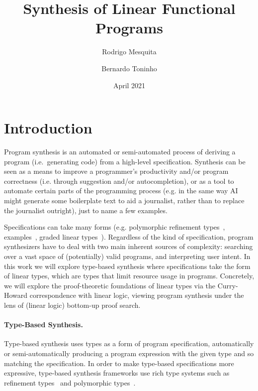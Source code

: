 \documentclass{llncs}
\title{Synthesis of Linear Functional Programs}
\author{Rodrigo Mesquita \and Bernardo Toninho}
\date{April 2021}
\institute{NOVA School of Science and Technology}
\newcommand{\mypara}[1]{\paragraph{\textbf{#1}.}}
\begin{document}
\maketitle

\section{Introduction}

Program synthesis is an automated or semi-automated process of
deriving a program (i.e.~generating code) from a high-level
specification.  
%
Synthesis can be seen as a means to improve a programmer's
productivity and/or program correctness (i.e. through suggestion
and/or autocompletion), or as a tool to automate certain parts of the
programming process (e.g. in the same way AI might generate some
boilerplate text to aid a journalist, rather than to replace the
journalist outright), just to name a few examples.

Specifications can take many forms (e.g.  polymorphic refinement
types~\cite{DBLP:conf/pldi/PolikarpovaKS16},
examples~\cite{DBLP:conf/popl/FrankleOWZ16}, graded linear
types~\cite{DBLP:conf/lopstr/HughesO20}).  Regardless of the kind
of specification, program synthesizers have to deal with two main
inherent sources of complexity: searching over a vast space of
(potentially) valid programs, and interpreting user intent.
%
In this work we will explore type-based synthesis where specifications
take the form of linear types, which are types that limit resource
usage in programs.  Concretely, we will explore the proof-theoretic
foundations of linear types via the Curry-Howard correspondence with
linear logic, viewing program synthesis under the lens of (linear
logic) bottom-up proof search.

%

\mypara{Type-Based Synthesis}
Type-based synthesis uses types as a form of program specification,
automatically or semi-automatically producing a program expression
with the given type and so matching the specification.
%
In order to make type-based specifications more expressive, type-based
synthesis frameworks use rich type systems such as refinement
types~\cite{} and polymorphic types~\cite{}.
\end{document}
